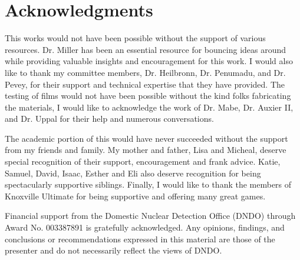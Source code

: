 \chapter*{Acknowledgments}

This works would not have been possible without the support of various resources.
Dr. Miller has been an essential resource for bouncing ideas around while providing valuable insights and encouragement for this work.
I would also like to thank my committee members, Dr. Heilbronn, Dr. Penumadu, and Dr. Pevey, for their support and technical expertise that they have provided. 
The testing of films would not have been possible without the kind folks fabricating the materials, I would like to acknowledge the work of Dr. Mabe, Dr. Auxier II, and Dr. Uppal for their help and numerous conversations.

The academic portion of this would have never succeeded without the support from my friends and family. 
My mother and father, Lisa and Micheal, deserve special recognition of their support, encouragement and frank advice. 
Katie, Samuel, David, Isaac, Esther and Eli also deserve recognition for being spectacularly supportive siblings. 
Finally, I would like to thank the members of Knoxville Ultimate for being supportive and offering many great games.

Financial support from the Domestic Nuclear Detection Office (DNDO) through Award No. 003387891 is gratefully acknowledged. 
 Any opinions, findings, and conclusions or recommendations expressed in this material are those of the presenter and do not necessarily reflect the views of DNDO.
